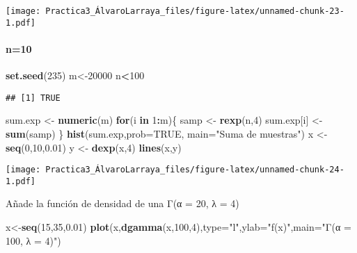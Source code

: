 \documentclass[
]{article}
\newenvironment{Shaded}{\begin{snugshade}}{\end{snugshade}}
\newcommand{\ControlFlowTok}[1]{\textcolor[rgb]{0.13,0.29,0.53}{\textbf{#1}}}
\newcommand{\DataTypeTok}[1]{\textcolor[rgb]{0.13,0.29,0.53}{#1}}
\newcommand{\DecValTok}[1]{\textcolor[rgb]{0.00,0.00,0.81}{#1}}
\newcommand{\FloatTok}[1]{\textcolor[rgb]{0.00,0.00,0.81}{#1}}
\newcommand{\KeywordTok}[1]{\textcolor[rgb]{0.13,0.29,0.53}{\textbf{#1}}}
\newcommand{\NormalTok}[1]{#1}
\newcommand{\OperatorTok}[1]{\textcolor[rgb]{0.81,0.36,0.00}{\textbf{#1}}}
\newcommand{\OtherTok}[1]{\textcolor[rgb]{0.56,0.35,0.01}{#1}}
\newcommand{\StringTok}[1]{\textcolor[rgb]{0.31,0.60,0.02}{#1}}
\begin{document}
\texttt{[image: Practica3\_ÁlvaroLarraya\_files/figure-latex/unnamed-chunk-23-1.pdf]}

\hypertarget{n10-1}{%
\paragraph{n=10}\label{n10-1}}

\begin{Shaded}
\begin{Highlighting}[]
\KeywordTok{set.seed}\NormalTok{(}\DecValTok{235}\NormalTok{)}
\NormalTok{m<-}\DecValTok{20000}
\NormalTok{n}\OperatorTok{<}\DecValTok{100}
\end{Highlighting}
\end{Shaded}

\begin{verbatim}
## [1] TRUE
\end{verbatim}

\begin{Shaded}
\begin{Highlighting}[]
\NormalTok{sum.exp <-}\StringTok{ }\KeywordTok{numeric}\NormalTok{(m)}
\ControlFlowTok{for}\NormalTok{(i }\ControlFlowTok{in} \DecValTok{1}\OperatorTok{:}\NormalTok{m)\{}
\NormalTok{samp <-}\StringTok{ }\KeywordTok{rexp}\NormalTok{(n,}\DecValTok{4}\NormalTok{)}
\NormalTok{sum.exp[i] <-}\StringTok{ }\KeywordTok{sum}\NormalTok{(samp)}
\NormalTok{\}}
\KeywordTok{hist}\NormalTok{(sum.exp,}\DataTypeTok{prob=}\OtherTok{TRUE}\NormalTok{, }\DataTypeTok{main=}\StringTok{"Suma de muestras"}\NormalTok{)}
\NormalTok{x <-}\StringTok{ }\KeywordTok{seq}\NormalTok{(}\DecValTok{0}\NormalTok{,}\DecValTok{10}\NormalTok{,}\FloatTok{0.01}\NormalTok{)}
\NormalTok{y <-}\StringTok{ }\KeywordTok{dexp}\NormalTok{(x,}\DecValTok{4}\NormalTok{)}
\KeywordTok{lines}\NormalTok{(x,y)}
\end{Highlighting}
\end{Shaded}

\texttt{[image: Practica3\_ÁlvaroLarraya\_files/figure-latex/unnamed-chunk-24-1.pdf]}

Añade la función de densidad de una Γ(α = 20, λ = 4)

\begin{Shaded}
\begin{Highlighting}[]
\NormalTok{x<-}\KeywordTok{seq}\NormalTok{(}\DecValTok{15}\NormalTok{,}\DecValTok{35}\NormalTok{,}\FloatTok{0.01}\NormalTok{)}
\KeywordTok{plot}\NormalTok{(x,}\KeywordTok{dgamma}\NormalTok{(x,}\DecValTok{100}\NormalTok{,}\DecValTok{4}\NormalTok{),}\DataTypeTok{type=}\StringTok{"l"}\NormalTok{,}\DataTypeTok{ylab=}\StringTok{"f(x)"}\NormalTok{,}\DataTypeTok{main=}\StringTok{"Γ(α = 100, λ = 4)"}\NormalTok{)}
\end{Highlighting}
\end{Shaded}
\end{document}
